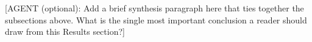 \documentclass[9pt,a4paper,twocolumn,twoside]{rho-class/rho}
\begin{document}
    [AGENT (optional): Add a brief synthesis paragraph
    here that ties together the subsections above. What is
    the single most important conclusion a reader should
    draw from this Results section?]

%
%

\printbibliography

%
%
%
%
\end{document}
